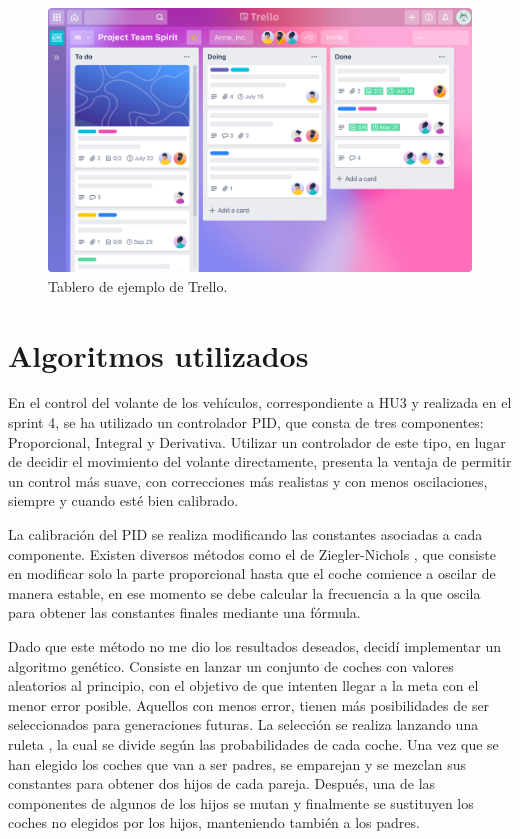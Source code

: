 \begin{figure}[H]
    \centering
    \includegraphics[width=\textwidth]{imagenes/trello.png}
    \caption{Tablero de ejemplo de Trello\cite{tablero-trello}.}
\end{figure}

\section{Algoritmos utilizados}
En el control del volante de los vehículos, correspondiente a HU3 y realizada en el sprint 4, se ha utilizado un controlador PID, que consta de tres componentes: Proporcional, Integral y Derivativa. Utilizar un controlador de este tipo, en lugar de decidir el movimiento del volante directamente, presenta la ventaja de permitir un control más suave, con correcciones más realistas y con menos oscilaciones, siempre y cuando esté bien calibrado.

\bigskip

La calibración del PID se realiza modificando las constantes asociadas a cada componente. Existen diversos métodos como el de Ziegler-Nichols \cite{enwiki:1140258750}, que consiste en modificar solo la parte proporcional hasta que el coche comience a oscilar de manera estable, en ese momento se debe calcular la frecuencia a la que oscila para obtener las constantes finales mediante una fórmula. 

\bigskip

Dado que este método no me dio los resultados deseados, decidí implementar un algoritmo genético. Consiste en lanzar un conjunto de coches con valores aleatorios al principio, con el objetivo de que intenten llegar a la meta con el menor error posible. Aquellos con menos error, tienen más posibilidades de ser seleccionados para generaciones futuras. La selección se realiza lanzando una ruleta \cite{enwiki:1141636554}, la cual se divide según las probabilidades de cada coche. Una vez que se han elegido los coches que van a ser padres, se emparejan y se mezclan sus constantes para obtener dos hijos de cada pareja. Después, una de las componentes de algunos de los hijos se mutan y finalmente se sustituyen los coches no elegidos por los hijos, manteniendo también a los padres.

